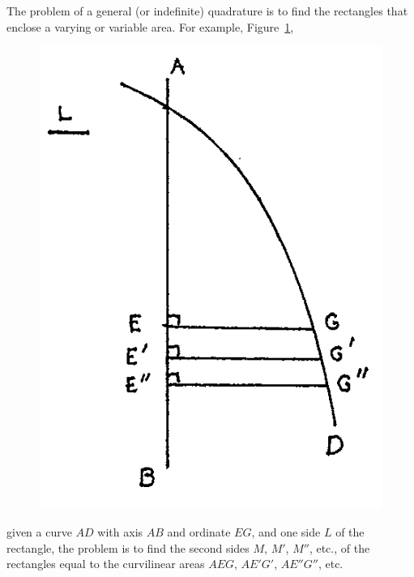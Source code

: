 \documentclass[twoside,openright]{article}
\begin{document}
The problem of a general (or indefinite) quadrature is to find the
rectangles that enclose a varying or variable area.  For example,
Figure~\ref{fig25b},
\begin{figure}[htp]
\begin{center}
\includegraphics[width=.5\textwidth]{fig/Figure29B}
\caption{}
\label{fig25b}
\end{center}
\end{figure} 
given a curve $AD$ with axis $AB$ and ordinate $EG$, and one side $L$
of the rectangle, the problem is to find the second sides $M$, $M'$,
$M''$, etc., of the rectangles equal to the curvilinear areas $AEG$,
$AE'G'$, $AE''G''$, etc.
 
\end{document}
